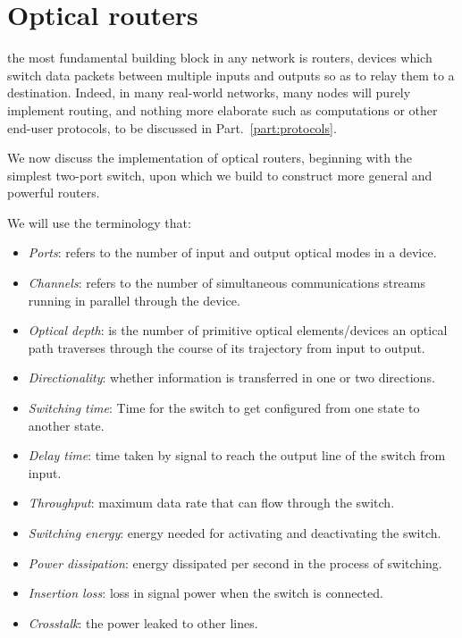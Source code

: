 %
%

\section{Optical routers} 

 the most fundamental building block in any network is routers, devices which switch data packets between multiple inputs and outputs so as to relay them to a destination. Indeed, in many real-world networks, many nodes will purely implement routing, and nothing more elaborate such as computations or other end-user protocols, to be discussed in Part.~\ref{part:protocols}.

We now discuss the implementation of optical routers, beginning with the simplest two-port switch, upon which we build to construct more general and powerful routers.

We will use the terminology that:
\begin{itemize}
	\item \textit{Ports}: refers to the number of input and output optical modes in a device.
	\item \textit{Channels}: refers to the number of simultaneous communications streams running in parallel through the device.
	\item \textit{Optical depth}: is the number of primitive optical elements/devices an optical path traverses through the course of its trajectory from input to output.
	\item \textit{Directionality}: whether information is transferred in one or two directions.
	\item \textit{Switching time}: Time for the switch to get configured from one state to another state.
	\item \textit{Delay time}: time taken by signal to reach the output line of the switch from input.
	\item \textit{Throughput}: maximum data rate that can flow through the switch.
	\item \textit{Switching energy}: energy needed for activating and deactivating the switch.
	\item \textit{Power dissipation}: energy dissipated per second in the process of switching.
	\item \textit{Insertion loss}: loss in signal power when the switch is connected.
	\item \textit{Crosstalk}: the power leaked to other lines.
\end{itemize}

